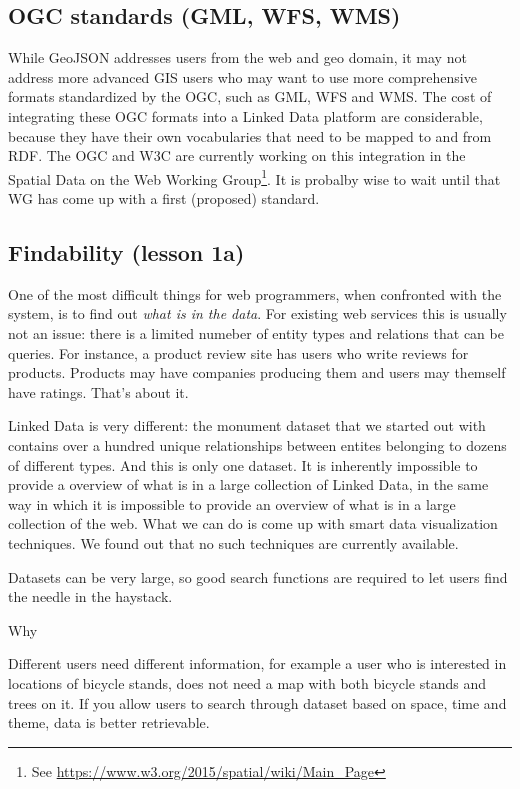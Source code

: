 \documentclass[a4paper]{scrartcl}
\begin{document}
\subsection{OGC standards (GML, WFS, WMS)}

While GeoJSON addresses users from the web and geo domain, it may not
address more advanced GIS users who may want to use more comprehensive
formats standardized by the OGC, such as GML, WFS and WMS.  The cost
of integrating these OGC formats into a Linked Data platform are
considerable, because they have their own vocabularies that need to be
mapped to and from RDF.  The OGC and W3C are currently working on this
integration in the Spatial Data on the Web Working Group\footnote{See
  \url{https://www.w3.org/2015/spatial/wiki/Main_Page}}.  It is
probalby wise to wait until that WG has come up with a first
(proposed) standard.


\subsection{Findability (lesson 1a)}

One of the most difficult things for web programmers, when confronted
with the system, is to find out \emph{what is in the data}.  For
existing web services this is usually not an issue: there is a limited
numeber of entity types and relations that can be queries.  For
instance, a product review site has users who write reviews for
products.  Products may have companies producing them and users may
themself have ratings.  That's about it.

Linked Data is very different: the monument dataset that we started
out with contains over a hundred unique relationships between entites
belonging to dozens of different types.  And this is only one dataset.
It is inherently impossible to provide a overview of what is in a
large collection of Linked Data, in the same way in which it is
impossible to provide an overview of what is in a large collection of
the web.  What we can do is come up with smart data visualization
techniques.  We found out that no such techniques are currently
available.

Datasets can be very large, so good search functions are required to
let users find the needle in the haystack.

Why

Different users need different information, for example a user who is
interested in locations of bicycle stands, does not need a map with
both bicycle stands and trees on it.  If you allow users to search
through dataset based on space, time and theme, data is better
retrievable.
\end{document}
